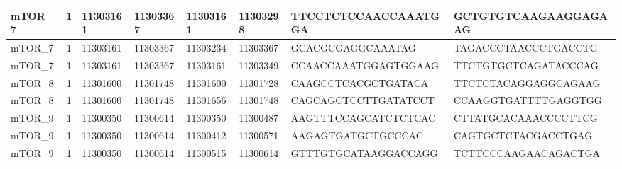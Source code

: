 \begin{landscape}
\begin{longtable}{| p{} | p{} | p{} | p{} | p{} | p{} | p{} | p{} |}
\multicolumn{1}{|l|}{mTOR\_7}    & \multicolumn{1}{c|}{1}  & \multicolumn{1}{l|}{11303161}  & \multicolumn{1}{l|}{11303367}  & \multicolumn{1}{l|}{11303161}  & \multicolumn{1}{l|}{11303298}  & \multicolumn{1}{l|}{TTCCTCTCCAACCAAATGGA}            & \multicolumn{1}{l|}{GCTGTGTCAAGAAGGAGAAG}          \\ \hline
\multicolumn{1}{|l|}{mTOR\_7}    & \multicolumn{1}{c|}{1}  & \multicolumn{1}{l|}{11303161}  & \multicolumn{1}{l|}{11303367}  & \multicolumn{1}{l|}{11303234}  & \multicolumn{1}{l|}{11303367}  & \multicolumn{1}{l|}{GCACGCGAGGCAAATAG}               & \multicolumn{1}{l|}{TAGACCCTAACCCTGACCTG}          \\ \hline
\multicolumn{1}{|l|}{mTOR\_7}    & \multicolumn{1}{c|}{1}  & \multicolumn{1}{l|}{11303161}  & \multicolumn{1}{l|}{11303367}  & \multicolumn{1}{l|}{11303161}  & \multicolumn{1}{l|}{11303349}  & \multicolumn{1}{l|}{CCAACCAAATGGAGTGGAAG}            & \multicolumn{1}{l|}{TTCTGTGCTCAGATACCCAG}          \\ \hline
\multicolumn{1}{|l|}{mTOR\_8}    & \multicolumn{1}{c|}{1}  & \multicolumn{1}{l|}{11301600}  & \multicolumn{1}{l|}{11301748}  & \multicolumn{1}{l|}{11301600}  & \multicolumn{1}{l|}{11301728}  & \multicolumn{1}{l|}{CAAGCCTCACGCTGATACA}             & \multicolumn{1}{l|}{TTCTCTACAGGAGGCAGAAG}          \\ \hline
\multicolumn{1}{|l|}{mTOR\_8}    & \multicolumn{1}{c|}{1}  & \multicolumn{1}{l|}{11301600}  & \multicolumn{1}{l|}{11301748}  & \multicolumn{1}{l|}{11301656}  & \multicolumn{1}{l|}{11301748}  & \multicolumn{1}{l|}{CAGCAGCTCCTTGATATCCT}            & \multicolumn{1}{l|}{CCAAGGTGATTTTGAGGTGG}          \\ \hline
\multicolumn{1}{|l|}{mTOR\_9}    & \multicolumn{1}{c|}{1}  & \multicolumn{1}{l|}{11300350}  & \multicolumn{1}{l|}{11300614}  & \multicolumn{1}{l|}{11300350}  & \multicolumn{1}{l|}{11300487}  & \multicolumn{1}{l|}{AAGTTTCCAGCATCTCTCAC}            & \multicolumn{1}{l|}{CTTATGCACAAACCCCTTCG}          \\ \hline
\multicolumn{1}{|l|}{mTOR\_9}    & \multicolumn{1}{c|}{1}  & \multicolumn{1}{l|}{11300350}  & \multicolumn{1}{l|}{11300614}  & \multicolumn{1}{l|}{11300412}  & \multicolumn{1}{l|}{11300571}  & \multicolumn{1}{l|}{AAGAGTGATGCTGCCCAC}              & \multicolumn{1}{l|}{CAGTGCTCTACGACCTGAG}           \\ \hline
\multicolumn{1}{|l|}{mTOR\_9}    & \multicolumn{1}{c|}{1}  & \multicolumn{1}{l|}{11300350}  & \multicolumn{1}{l|}{11300614}  & \multicolumn{1}{l|}{11300515}  & \multicolumn{1}{l|}{11300614}  & \multicolumn{1}{l|}{GTTTGTGCATAAGGACCAGG}            & \multicolumn{1}{l|}{TCTTCCCAAGAACAGACTGA}          \\ \hline

\end{longtable}
\end{landscape}
